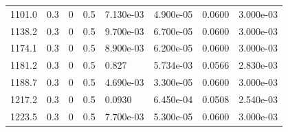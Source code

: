 \documentclass[preview]{standalone}
\begin{document}
{{\begin{tabular}{L{1.2cm}C{1.2cm} C{0.3cm}C{0.5cm} C{1.4cm}C{1.4cm} C{1.4cm}C{1.4cm}}
  1101.0  &   0.3  & 0     & 0.5 &  7.130e-03  & 4.900e-05  & 0.0600 &  3.000e-03   \\ 
  1138.2  &   0.3  & 0     & 0.5 &  9.700e-03  & 6.700e-05  & 0.0600 &  3.000e-03   \\ 
  1174.1  &   0.3  & 0     & 0.5 &  8.900e-03  & 6.200e-05  & 0.0600 &  3.000e-03   \\ 
  1181.2  &   0.3  & 0     & 0.5 &  0.827  & 5.734e-03  & 0.0566 &  2.830e-03   \\ 
  1188.7  &   0.3  & 0     & 0.5 &  4.690e-03  & 3.300e-05  & 0.0600 &  3.000e-03   \\ 
  1217.2  &   0.3  & 0     & 0.5 &  0.0930  & 6.450e-04  & 0.0508 &  2.540e-03   \\ 
  1223.5  &   0.3  & 0     & 0.5 &  7.700e-03  & 5.300e-05  & 0.0600 &  3.000e-03   \\ 
\hline 
\end{tabular} 

}}
\end{document}
